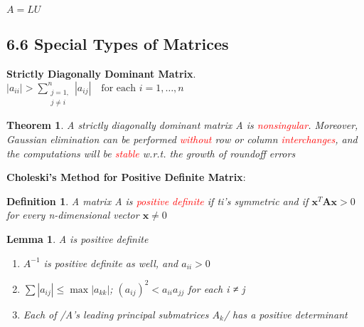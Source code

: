 \documentclass[11pt]{article}
\newtheorem{theorem}{Theorem}[section]
\newtheorem{definition}{Definition}[section]
\newtheorem{lemma}{Lemma}[section]
\begin{document}
\(A=LU\)
\subsection{6.6 Special Types of Matrices}
\label{sec:org0fe84f8}
\textbf{Strictly Diagonally Dominant Matrix}.
\(|a_{ii}|>\displaystyle\sum_{\substack{j=1,\\j\neq i}}^n|a_{ij}| \quad
   \text{for each } i=1,\dots,n\)

\begin{theorem}
A strictly diagonally dominant matrix A is \textcolor{red}{nonsingular}. Moreover,
Gaussian elimination can be performed \textcolor{red}{without} row or column
\textcolor{red}{interchanges}, and the computations will be \textcolor{red}{stable}
w.r.t. the growth of roundoff errors
\end{theorem}

\textbf{Choleski's Method for Positive Definite Matrix}:
\begin{definition}
A matrix A is \textcolor{red}{positive definite} if ti's symmetric and if    
$ \mathbf{x}^T \mathbf{A} \mathbf{x}>0$ for every n-dimensional vector $ \mathbf{x}\neq 0$
\end{definition}

\begin{lemma}
A is positive definite
\begin{enumerate}
\item $A^{-1}$ is positive definite as well, and $a_{ii}>0$
\item $\sum|a_{ij}|\le\max|a_{kk}|$; $(a_{ij})^2<a_{ii}a_{jj}$ for each i ≠ j
\item Each of /A's leading principal submatrices $A_k$/ has a positive determinant
\end{enumerate}
\end{lemma}
\end{document}
